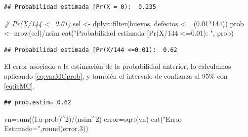 \documentclass[
]{book}
\newenvironment{Shaded}{\begin{snugshade}}{\end{snugshade}}
\newcommand{\CommentTok}[1]{\textcolor[rgb]{0.56,0.35,0.01}{\textit{#1}}}
\newcommand{\DecValTok}[1]{\textcolor[rgb]{0.00,0.00,0.81}{#1}}
\newcommand{\FloatTok}[1]{\textcolor[rgb]{0.00,0.00,0.81}{#1}}
\newcommand{\FunctionTok}[1]{\textcolor[rgb]{0.00,0.00,0.00}{#1}}
\newcommand{\NormalTok}[1]{#1}
\newcommand{\OtherTok}[1]{\textcolor[rgb]{0.56,0.35,0.01}{#1}}
\newcommand{\SpecialCharTok}[1]{\textcolor[rgb]{0.00,0.00,0.00}{#1}}
\newcommand{\StringTok}[1]{\textcolor[rgb]{0.31,0.60,0.02}{#1}}
\theoremstyle{definition}
\theoremstyle{definition}
\theoremstyle{definition}
\theoremstyle{definition}
\theoremstyle{remark}
\begin{document}
\begin{verbatim}
## Probabilidad estimada [Pr(X = 0):  0.235
\end{verbatim}

\begin{Shaded}
\begin{Highlighting}[]
\CommentTok{\# Pr(X/144 \textless{}=0.01)}
\NormalTok{sel }\OtherTok{\textless{}{-}}\NormalTok{ dplyr}\SpecialCharTok{::}\FunctionTok{filter}\NormalTok{(huevos, defectos }\SpecialCharTok{\textless{}=}\NormalTok{ (}\FloatTok{0.01}\SpecialCharTok{*}\DecValTok{144}\NormalTok{))}
\NormalTok{prob }\OtherTok{\textless{}{-}} \FunctionTok{nrow}\NormalTok{(sel)}\SpecialCharTok{/}\NormalTok{nsim}
\FunctionTok{cat}\NormalTok{(}\StringTok{"Probabilidad estimada [Pr(X/144 \textless{}=0.01): "}\NormalTok{, prob)}
\end{Highlighting}
\end{Shaded}

\begin{verbatim}
## Probabilidad estimada [Pr(X/144 <=0.01):  0.62
\end{verbatim}

El error asociado a la estimación de la probabilidad anterior, lo calculamos aplicando \eqref{eq:varMCprob}, y también el intervalo de confianza al 95\% con \eqref{eq:icMC}.

\begin{Shaded}
\end{Shaded}

\begin{verbatim}
## prob.estim= 0.62
\end{verbatim}

\begin{Shaded}
\begin{Highlighting}[]
\NormalTok{vn}\OtherTok{=}\FunctionTok{sum}\NormalTok{((I.a}\SpecialCharTok{{-}}\NormalTok{prob)}\SpecialCharTok{\^{}}\DecValTok{2}\NormalTok{)}\SpecialCharTok{/}\NormalTok{(nsim}\SpecialCharTok{\^{}}\DecValTok{2}\NormalTok{)}
\NormalTok{error}\OtherTok{=}\FunctionTok{sqrt}\NormalTok{(vn)}
\FunctionTok{cat}\NormalTok{(}\StringTok{"Error Estimado="}\NormalTok{,}\FunctionTok{round}\NormalTok{(error,}\DecValTok{3}\NormalTok{))}
\end{Highlighting}
\end{Shaded}
\end{document}
